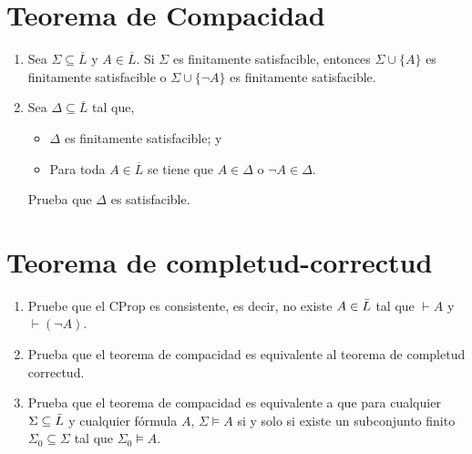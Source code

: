 \documentclass[letterpaper,DIV=15,headsepline,12pt]{scrartcl}
\begin{document}
    \newpage
    \section*{Teorema de Compacidad}
        \begin{enumerate}
            \item Sea $\Sigma\subseteq\overline{L}$ y $A\in\overline{L}$. Si $\Sigma$ es finitamente satisfacible, entonces $\Sigma\cup\{A\}$ es finitamente satisfacible o $\Sigma\cup\{\neg A\}$ es finitamente satisfacible.
            \item  Sea $\Delta\subseteq\overline{L}$ tal que,
                    \begin{itemize}
                        \item $\Delta$ es finitamente satisfacible; y
                        \item Para toda $A\in\overline{L}$ se tiene que $A\in \Delta$ o $\neg A\in\Delta$.
                    \end{itemize}
                    Prueba que $\Delta$ es satisfacible.
        \end{enumerate}
    
    \newpage
    \section*{Teorema de completud-correctud}
        \begin{enumerate}
            \item Pruebe que el CProp es consistente, es decir, no existe $A\in \Bar{L}$ tal que $\vdash A$ y $\vdash (\neg A)$.
            \item Prueba que el teorema de compacidad es equivalente al teorema de completud correctud.
            \item Prueba que el teorema de compacidad es equivalente a que para cualquier $\Sigma\subseteq \Bar{L}$ y cualquier fórmula $A$, $\Sigma\vDash A$ si y solo si existe un subconjunto finito $\Sigma_0\subseteq\Sigma$ tal que $\Sigma_0\vDash A$.
        \end{enumerate}
\end{document}
